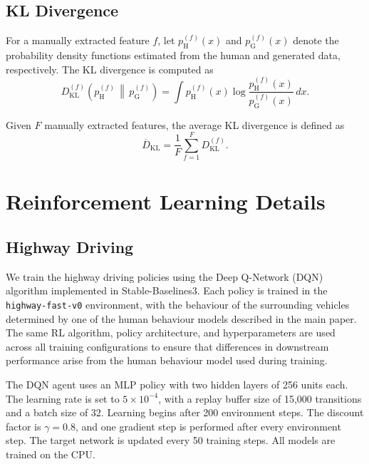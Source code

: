 \documentclass[journal]{IEEEtran}
\begin{document}
\subsection{KL Divergence}

For a manually extracted feature \(f\), let \(p_{\mathrm{H}}^{(f)}(x)\) and \(p_{\mathrm{G}}^{(f)}(x)\) denote the probability density functions estimated from the human and generated data, respectively. The KL divergence is computed as
\begin{equation}
    D_{\mathrm{KL}}^{(f)}
    \left(
        p_{\mathrm{H}}^{(f)}
        \,\middle\|\,
        p_{\mathrm{G}}^{(f)}
    \right)
    =
    \int
    p_{\mathrm{H}}^{(f)}(x)
    \log
    \frac{
        p_{\mathrm{H}}^{(f)}(x)
    }{
        p_{\mathrm{G}}^{(f)}(x)
    }
    \, dx.
\end{equation}

Given \(F\) manually extracted features, the average KL divergence is defined as
\begin{equation}
    \overline{D}_{\mathrm{KL}}
    =
    \frac{1}{F}
    \sum_{f=1}^{F}
    D_{\mathrm{KL}}^{(f)}.
\end{equation}

\section{Reinforcement Learning Details}
\label{sec:rl_details}

\subsection{Highway Driving}

We train the highway driving policies using the Deep Q-Network (DQN) algorithm implemented in Stable-Baselines3. Each policy is trained in the \texttt{highway-fast-v0} environment, with the behaviour of the surrounding vehicles determined by one of the human behaviour models described in the main paper. The same RL algorithm, policy architecture, and hyperparameters are used across all training configurations to ensure that differences in downstream performance arise from the human behaviour model used during training.

The DQN agent uses an MLP policy with two hidden layers of 256 units each. The learning rate is set to $5\times10^{-4}$, with a replay buffer size of 15{,}000 transitions and a batch size of 32. Learning begins after 200 environment steps. The discount factor is $\gamma=0.8$, and one gradient step is performed after every environment step. The target network is updated every 50 training steps. All models are trained on the CPU.
\end{document}
